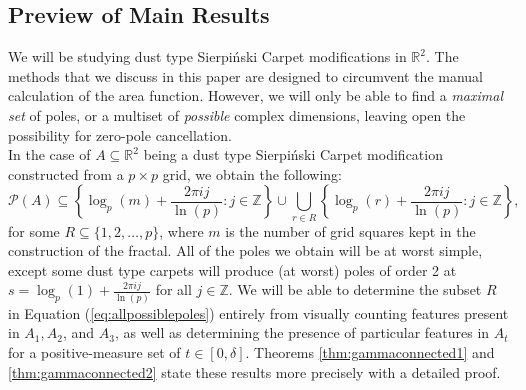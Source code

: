 \documentclass{article}
\theoremstyle{plain}
\numberwithin{equation}{section}
\numberwithin{table}{section}
\numberwithin{figure}{section}
\newcommand{\vaddspace}[1]{\rule{0pt}{#1pt}}
\newcommand{\newparagraph}{\vaddspace{10}}
\begin{document}




\subsection{Preview of Main Results} \label{chap:previewresults}
We will be studying dust type Sierpi\'nski Carpet modifications in $\mathbb{R}^2$. The methods that we discuss in this paper are designed to circumvent the manual calculation of the area function. However, we will only be able to find a \textit{maximal set} of poles, or a multiset of \textit{possible} complex dimensions, leaving open the possibility for zero-pole cancellation. \\

In the case of $A \subseteq \mathbb{R}^2$ being a dust type Sierpi\'nski Carpet modification constructed from a $p\times p$ grid, we obtain the following:
\begin{equation}
\mathscr{P}(A) \subseteq \left\{\log_p(m) + \frac{2\pi i j}{\ln(p)} : j \in \mathbb{Z}\right\} \cup \bigcup_{r \in R} \left\{\log_p(r) + \frac{2\pi i j}{\ln(p)} : j \in \mathbb{Z}\right\},\label{eq:allpossiblepoles}
\end{equation} 
for some $R \subseteq \{1,2,\dots,p\}$, where $m$ is the number of grid squares kept in the construction of the fractal. All of the poles we obtain will be at worst simple, except some dust type carpets will produce (at worst) poles of order 2 at $s = \log_p(1) + \frac{2\pi i j}{\ln(p)}$ for all $j \in \mathbb{Z}$. We will be able to determine the subset $R$ in Equation (\ref{eq:allpossiblepoles}) entirely from visually counting features present in $A_1, A_2$, and $A_3$, as well as determining the presence of particular features in $A_t$ for a positive-measure set of $t \in [0,\delta]$. Theorems \ref{thm:gammaconnected1} and \ref{thm:gammaconnected2} state these results more precisely with a detailed proof.
\newparagraph
\end{document}
